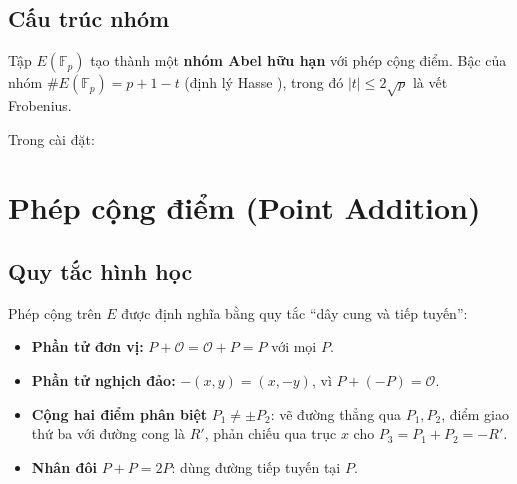 \subsection{Cấu trúc nhóm}\label{cux1ea5u-truxfac-nhuxf3m}

Tập \(E(\mathbb{F}_p)\) tạo thành một \textbf{nhóm Abel hữu hạn} với
phép cộng điểm. Bậc của nhóm \(\#E(\mathbb{F}_p) = p + 1 - t\) (định lý
Hasse \citep{Silverman2009}), trong đó \(|t| \leq 2\sqrt{p}\) là vết
Frobenius.

Trong cài đặt:

\begin{Shaded}
\begin{Highlighting}[]
 \OperatorTok{\textless{}}\OperatorTok{:}\OperatorTok{\textgreater{}} \OperatorTok{\{}
    \OperatorTok{:}\OperatorTok{\textless{}}\OperatorTok{\textgreater{},}
    \OperatorTok{:}\OperatorTok{\textless{}}\OperatorTok{\textgreater{},}
    \OperatorTok{:} \OperatorTok{,}
\OperatorTok{\}}
\end{Highlighting}
\end{Shaded}

\label{lst:ch2_affine}\vspace{12pt}

\section{Phép cộng điểm (Point
Addition)}\label{phuxe9p-cux1ed9ng-ux111iux1ec3m-point-addition}

\subsection{Quy tắc hình học}\label{quy-tux1eafc-huxecnh-hux1ecdc}

Phép cộng trên \(E\) được định nghĩa bằng quy tắc ``dây cung và tiếp
tuyến'':

\begin{itemize}
\tightlist
\item
  \textbf{Phần tử đơn vị:} \(P + \mathcal{O} = \mathcal{O} + P = P\) với
  mọi \(P\).
\item
  \textbf{Phần tử nghịch đảo:} \(-( x, y) = (x, -y)\), vì
  \(P + (-P) = \mathcal{O}\).
\item
  \textbf{Cộng hai điểm phân biệt} \(P_1 \neq \pm P_2\): vẽ đường thẳng
  qua \(P_1, P_2\), điểm giao thứ ba với đường cong là \(R'\), phản
  chiếu qua trục \(x\) cho \(P_3 = P_1 + P_2 = -R'\).
\item
  \textbf{Nhân đôi} \(P + P = 2P\): dùng đường tiếp tuyến tại \(P\).
\end{itemize}

